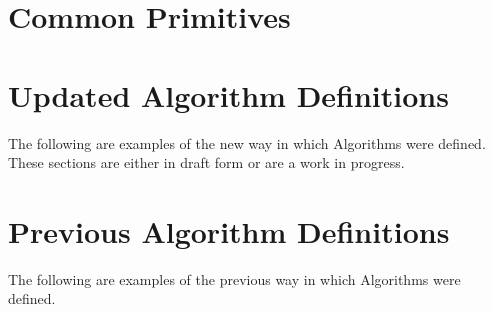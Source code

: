 \documentclass{article}
\begin{document}
\section{Common Primitives}




%

%

%

\section*{Updated Algorithm Definitions}
The following are examples of the new way in which Algorithms were defined. These sections are either in draft form or are a work in progress.





\section*{Previous Algorithm Definitions}
The following are examples of the previous way in which Algorithms were defined.






\end{document}
